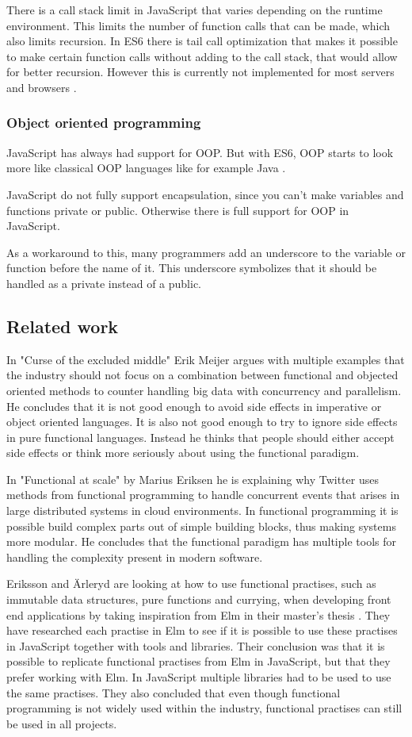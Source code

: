 \documentclass {article}
\begin{document}
There is a call stack limit in JavaScript that varies depending on the runtime environment. This limits the number of function calls that can be made, which also limits recursion. In ES6 there is tail call optimization that makes it possible to make certain function calls without adding to the call stack, that would allow for better recursion. However this is currently not implemented for most servers and browsers \cite{ecma6table}.
\subsubsection{Object oriented programming}
JavaScript has always had support for OOP. But 
with ES6, OOP starts to look more like classical OOP languages like for example Java \cite{ecmacompare}.

JavaScript do not fully support encapsulation, since you can't make variables and functions private or public. Otherwise there is full support for OOP in JavaScript.

As a  workaround to this, many programmers add an underscore to the variable or function before the name of it. This underscore symbolizes that it should be handled as a private instead of a public.
\subsection{Related work}
In "Curse of the excluded middle" \cite{meijer} Erik Meijer argues with multiple examples that the industry should not focus on a combination between functional and objected oriented methods to counter handling big data with concurrency and parallelism. He concludes that it is not good enough to avoid side effects in imperative or object oriented languages. It is also not good enough to try to ignore side effects in pure functional languages. Instead he thinks that people should either accept side effects or think more seriously about using the functional paradigm.

In "Functional at scale" \cite{eriksen} by Marius Eriksen he is explaining why Twitter uses methods from functional programming to handle concurrent events that arises in large distributed systems in cloud environments. In functional programming it is possible build complex parts out of simple building blocks, thus making systems more modular. He concludes that the functional paradigm has multiple tools for handling the complexity present in modern software.

Eriksson and \"{A}rleryd are looking at how to use functional practises, such as immutable data structures, pure functions and currying, when developing front end applications by taking inspiration from Elm in their master's thesis \cite{erikarl}. They have researched each practise in Elm to see if it is possible to use these practises in JavaScript together with tools and libraries. Their conclusion was that it is possible to replicate functional practises from Elm in JavaScript, but that they prefer working with Elm. In JavaScript multiple libraries had to be used to use the same practises. They also concluded that even though functional programming is not widely used within the industry, functional practises can still be used in all projects.
\end{document}
